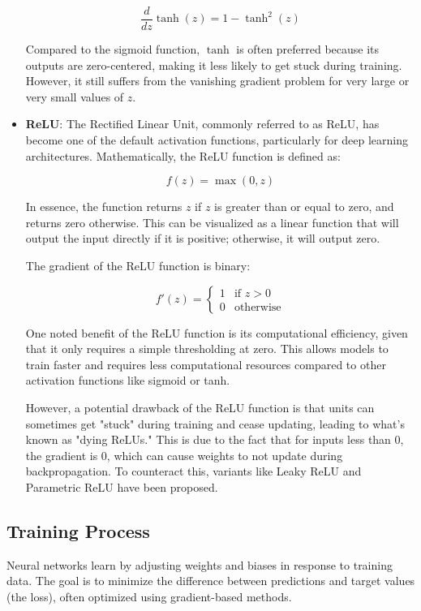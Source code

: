 \begin{itemize}
\[
\frac{d}{dz}\tanh(z) = 1 - \tanh^2(z)
\]

Compared to the sigmoid function, \( \tanh \) is often preferred because its outputs are zero-centered, making it less likely to get stuck during training. However, it still suffers from the vanishing gradient problem for very large or very small values of \( z \).
	
	\item \textbf{ReLU}: 
The Rectified Linear Unit, commonly referred to as ReLU, has become one of the default activation functions, particularly for deep learning architectures. Mathematically, the ReLU function is defined as:

\[
f(z) = \max(0, z)
\]

In essence, the function returns \( z \) if \( z \) is greater than or equal to zero, and returns zero otherwise. This can be visualized as a linear function that will output the input directly if it is positive; otherwise, it will output zero.

The gradient of the ReLU function is binary:

\[
f'(z) = 
\begin{cases} 
1 & \text{if } z > 0 \\
0 & \text{otherwise}
\end{cases}
\]

One noted benefit of the ReLU function is its computational efficiency, given that it only requires a simple thresholding at zero. This allows models to train faster and requires less computational resources compared to other activation functions like sigmoid or tanh.

However, a potential drawback of the ReLU function is that units can sometimes get "stuck" during training and cease updating, leading to what's known as "dying ReLUs." This is due to the fact that for inputs less than 0, the gradient is 0, which can cause weights to not update during backpropagation. To counteract this, variants like Leaky ReLU and Parametric ReLU have been proposed.
\end{itemize}

\subsection{Training Process}

Neural networks learn by adjusting weights and biases in response to training data. The goal is to minimize the difference between predictions and target values (the loss), often optimized using gradient-based methods.

